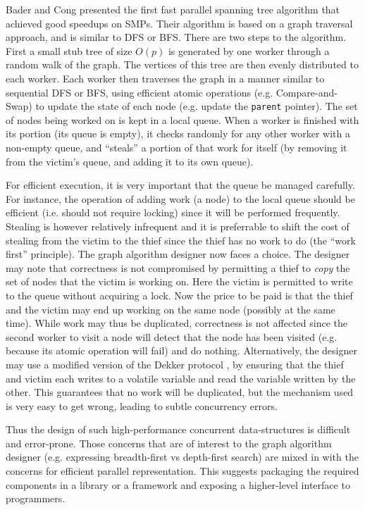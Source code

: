 \documentclass[10pt]{article}
\numberwithin{equation}{section}
\begin{document}
Bader and Cong \cite{BC04a} presented the first fast parallel spanning
tree algorithm that achieved good speedups on SMPs. Their algorithm is
based on a graph traversal approach, and is similar to DFS or BFS.
There are two steps to the algorithm. First a small stub tree of size
$O(p)$ is generated by one worker through a random walk of the
graph. The vertices of this tree are then evenly distributed to each
worker.  Each worker then traverses the graph in a manner similar to
sequential DFS or BFS, using efficient atomic operations (e.g.{}
Compare-and-Swap) to update the state of each node (e.g.{} update the
{\tt parent} pointer). The set of nodes being worked on is kept in a local queue.
When a worker is finished with its portion (its queue is empty), it
checks randomly for any other worker with a non-empty queue, and
``steals'' a portion of that work for itself (by removing it from the
victim's queue, and adding it to its own queue).

For efficient execution, it is very important that the queue be
managed carefully. For instance, the operation of adding work (a node)
to the local queue should be efficient (i.e.{} should not require
locking) since it will be performed frequently. Stealing is however
relatively infrequent and it is preferrable to shift the cost of
stealing from the victim to the thief since the thief has no work to
do (the ``work first'' principle). The graph algorithm designer now
faces a choice. The designer may note \cite{BC04} that correctness is
not compromised by permitting a thief to {\em copy} the set of nodes
that the victim is working on. Here the victim is permitted to write
to the queue without acquiring a lock. Now the price to be paid is
that the thief and the victim may end up working on the same node
(possibly at the same time).  While work may thus be duplicated,
correctness is not affected since the second worker to visit a node
will detect that the node has been visited (e.g.{} because its atomic
operation will fail) and do nothing. Alternatively, the designer may
use a modified version of the Dekker protocol \cite{cilk}, by ensuring
that the thief and victim each writes to a volatile variable and read
the variable written by the other. This guarantees that no work will
be duplicated, but the mechanism used is very easy to get wrong,
leading to subtle concurrency errors.

Thus the design of such high-performance concurrent data-structures is
difficult and error-prone. Those concerns that are of interest to the
graph algorithm designer (e.g.{} expressing breadth-first vs
depth-first search) are mixed in with the concerns for efficient
parallel representation.  This suggests packaging the required
components in a library or a framework and exposing a higher-level
interface to programmers.
\end{document}
